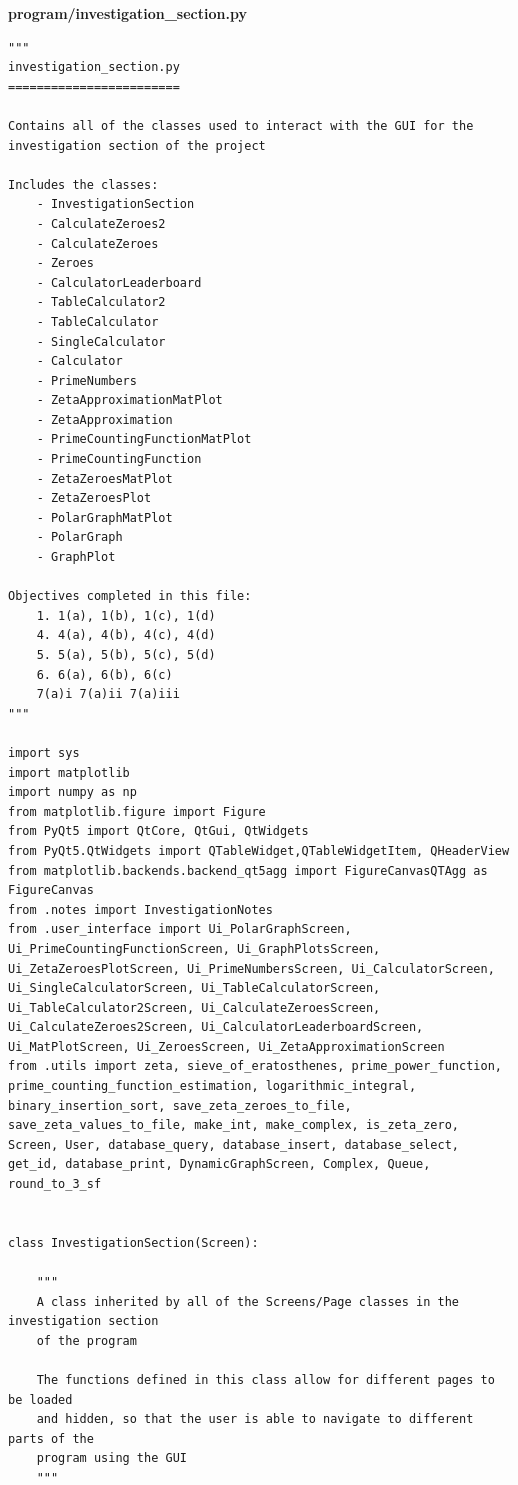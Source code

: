 \documentclass{article}
\begin{document}
\textbf{program/investigation\_section.py}

\begin{lstlisting}
"""
investigation_section.py
========================

Contains all of the classes used to interact with the GUI for the
investigation section of the project

Includes the classes:
    - InvestigationSection
    - CalculateZeroes2
    - CalculateZeroes
    - Zeroes
    - CalculatorLeaderboard
    - TableCalculator2
    - TableCalculator
    - SingleCalculator
    - Calculator
    - PrimeNumbers
    - ZetaApproximationMatPlot
    - ZetaApproximation
    - PrimeCountingFunctionMatPlot
    - PrimeCountingFunction
    - ZetaZeroesMatPlot
    - ZetaZeroesPlot
    - PolarGraphMatPlot
    - PolarGraph
    - GraphPlot

Objectives completed in this file:
    1. 1(a), 1(b), 1(c), 1(d)
    4. 4(a), 4(b), 4(c), 4(d)
    5. 5(a), 5(b), 5(c), 5(d)
    6. 6(a), 6(b), 6(c)
    7(a)i 7(a)ii 7(a)iii
"""

import sys
import matplotlib
import numpy as np
from matplotlib.figure import Figure
from PyQt5 import QtCore, QtGui, QtWidgets
from PyQt5.QtWidgets import QTableWidget,QTableWidgetItem, QHeaderView
from matplotlib.backends.backend_qt5agg import FigureCanvasQTAgg as FigureCanvas
from .notes import InvestigationNotes
from .user_interface import Ui_PolarGraphScreen, Ui_PrimeCountingFunctionScreen, Ui_GraphPlotsScreen, Ui_ZetaZeroesPlotScreen, Ui_PrimeNumbersScreen, Ui_CalculatorScreen, Ui_SingleCalculatorScreen, Ui_TableCalculatorScreen, Ui_TableCalculator2Screen, Ui_CalculateZeroesScreen, Ui_CalculateZeroes2Screen, Ui_CalculatorLeaderboardScreen, Ui_MatPlotScreen, Ui_ZeroesScreen, Ui_ZetaApproximationScreen
from .utils import zeta, sieve_of_eratosthenes, prime_power_function, prime_counting_function_estimation, logarithmic_integral, binary_insertion_sort, save_zeta_zeroes_to_file, save_zeta_values_to_file, make_int, make_complex, is_zeta_zero, Screen, User, database_query, database_insert, database_select, get_id, database_print, DynamicGraphScreen, Complex, Queue, round_to_3_sf


class InvestigationSection(Screen):

    """
    A class inherited by all of the Screens/Page classes in the investigation section
    of the program

    The functions defined in this class allow for different pages to be loaded
    and hidden, so that the user is able to navigate to different parts of the
    program using the GUI
    """


\end{lstlisting}
\end{document}

